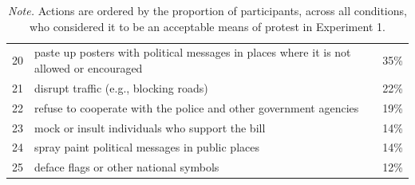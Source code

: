 \documentclass[12pt, letterpaper]{article}
\begin{document}
\begin{table}
\begin{tabularx}{\linewidth}{rXr}
20 & paste up posters with political messages in places where it is not allowed or encouraged & 35\%\\
21 & disrupt traffic (e.g., blocking roads) & 22\%\\
22 & refuse to cooperate with the police and other government agencies & 19\%\\
23 & mock or insult individuals who support the bill & 14\%\\
24 & spray paint political messages in public places & 14\%\\
25 & deface flags or other national symbols & 12\%\\
\bottomrule
\end{tabularx}
\caption*{\textit{Note.} Actions are ordered by the proportion of participants, across all conditions, who considered it to be an acceptable means of protest in Experiment 1.}

\end{table}

\setcounter{table}{0}
\renewcommand{\thetable}{B\arabic{table}}
\end{document}
